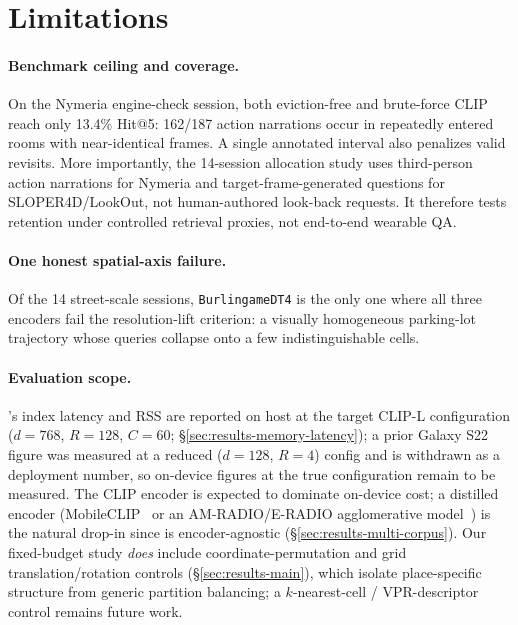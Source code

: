 
\section{Limitations}
\label{sec:limitations}

\paragraph{Benchmark ceiling and coverage.}
On the Nymeria engine-check session, both eviction-free \psm{} and brute-force
CLIP reach only 13.4\% Hit@5: 162/187 action narrations occur in repeatedly
entered rooms with near-identical frames. A single annotated interval also
penalizes valid revisits. More importantly, the 14-session allocation study uses
third-person action narrations for Nymeria and target-frame-generated questions
for SLOPER4D/LookOut, not human-authored look-back requests. It therefore tests
retention under controlled retrieval proxies, not end-to-end wearable QA.

\paragraph{One honest spatial-axis failure.}
Of the 14 street-scale sessions, \texttt{BurlingameDT4} is the only one
where all three encoders fail the resolution-lift criterion: a visually
homogeneous parking-lot trajectory whose queries collapse onto a few
indistinguishable cells.

\paragraph{Evaluation scope.}
\psm's index latency and RSS are reported on host at the target CLIP-L
configuration ($d{=}768$, $R{=}128$, $C{=}60$; \S\ref{sec:results-memory-latency});
a prior Galaxy S22 figure was measured at a reduced ($d{=}128$, $R{=}4$) config and
is withdrawn as a deployment number, so on-device figures at the true configuration
remain to be measured. The CLIP encoder is expected to dominate on-device cost;
a distilled encoder (MobileCLIP~\cite{vasu2024mobileclip} or an AM-RADIO/E-RADIO
agglomerative model~\cite{ranzinger2024radio}) is the natural drop-in since \psm{}
is encoder-agnostic (\S\ref{sec:results-multi-corpus}). Our fixed-budget study
\emph{does} include coordinate-permutation and grid translation/rotation controls
(\S\ref{sec:results-main}), which isolate place-specific structure from generic
partition balancing; a $k$-nearest-cell / VPR-descriptor control remains future
work.

